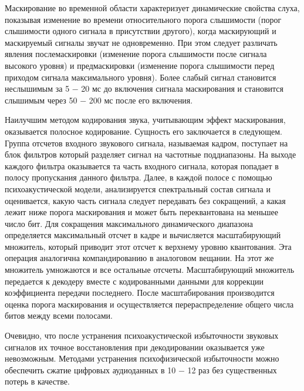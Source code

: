 \documentclass[a4paper]{report}
\begin{document}
Маскирование во временной области характеризует динамические свойства слуха, показывая изменение во времени относительного порога слышимости (порог слышимости одного сигнала в присутствии другого), когда маскирующий и маскируемый сигналы звучат не одновременно. При этом следует различать явления послемаскировки (изменение порога слышимости после сигнала высокого уровня) и предмаскировки (изменение порога слышимости перед приходом сигнала максимального уровня). Более слабый сигнал становится неслышимым за 5 − 20 мс до включения сигнала маскирования и становится слышимым через 50 − 200 мс после его включения.

Наилучшим методом кодирования звука, учитывающим эффект маскирования, оказывается полосное кодирование. Сущность его заключается в следующем. Группа отсчетов входного звукового сигнала, называемая кадром, поступает на блок фильтров который разделяет сигнал на частотные поддиапазоны. На выходе каждого фильтра оказывается та часть входного сигнала, которая попадает в полосу пропускания данного фильтра. Далее, в каждой полосе с помощью психоакустической модели, анализируется спектральный состав сигнала и оценивается, какую часть сигнала следует передавать без сокращений, а какая лежит ниже порога маскирования и может быть переквантована на меньшее число бит. Для сокращения максимального динамического диапазона определяется максимальный отсчет в кадре и вычисляется масштабирующий множитель, который приводит этот отсчет к верхнему уровню квантования. Эта операция аналогична компандированию в аналоговом вещании. На этот же множитель умножаются и все остальные отсчеты. Масштабирующий множитель передается к декодеру вместе с кодированными данными для коррекции коэффициента передачи последнего. После масштабирования производится оценка порога маскирования и осуществляется перераспределение общего числа битов между всеми полосами.

Очевидно, что после устранения психоакустической избыточности звуковых сигналов их точное восстановления при декодировании оказывается уже невозможным. Методами устранения психофизической избыточности можно обеспечить сжатие цифровых аудиоданных в 10 − 12 раз без существенных потерь в качестве.
\end{document}
